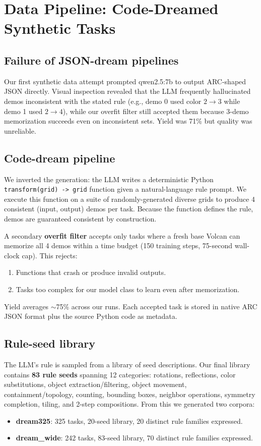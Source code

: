 \documentclass[11pt]{article}
\begin{document}
\section{Data Pipeline: Code-Dreamed Synthetic Tasks}

\subsection{Failure of JSON-dream pipelines}

Our first synthetic data attempt prompted qwen2.5:7b to output ARC-shaped JSON directly. Visual inspection revealed that the LLM frequently hallucinated demos inconsistent with the stated rule (e.g., demo 0 used color $2 \to 3$ while demo 1 used $2 \to 4$), while our overfit filter still accepted them because 3-demo memorization succeeds even on inconsistent sets. Yield was 71\% but quality was unreliable.

\subsection{Code-dream pipeline}

We inverted the generation: the LLM writes a deterministic Python \verb|transform(grid) -> grid| function given a natural-language rule prompt. We execute this function on a suite of randomly-generated diverse grids to produce 4 consistent (input, output) demos per task. Because the function defines the rule, demos are guaranteed consistent by construction.

A secondary \textbf{overfit filter} accepts only tasks where a fresh base Volcan can memorize all 4 demos within a time budget (150 training steps, 75-second wall-clock cap). This rejects:
\begin{enumerate}
    \item Functions that crash or produce invalid outputs.
    \item Tasks too complex for our model class to learn even after memorization.
\end{enumerate}

Yield averages $\sim$75\% across our runs. Each accepted task is stored in native ARC JSON format plus the source Python code as metadata.

\subsection{Rule-seed library}

The LLM's rule is sampled from a library of seed descriptions. Our final library contains \textbf{83 rule seeds} spanning 12 categories: rotations, reflections, color substitutions, object extraction/filtering, object movement, containment/topology, counting, bounding boxes, neighbor operations, symmetry completion, tiling, and 2-step compositions. From this we generated two corpora:
\begin{itemize}
    \item \textbf{dream325}: 325 tasks, 20-seed library, 20 distinct rule families expressed.
    \item \textbf{dream\_wide}: 242 tasks, 83-seed library, 70 distinct rule families expressed.
\end{itemize}
\end{document}
